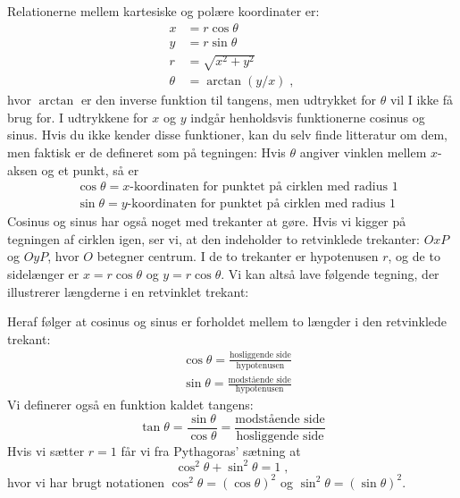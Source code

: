 Relationerne mellem kartesiske og polære koordinater er:
\begin{align*} \label{eq:kartesisk/polaer}
  x &= r \cos \theta \\
  y &= r \sin \theta \\
  r &= \sqrt{x^2 + y^2} \\
  \theta &= \arctan (y/x) \; ,
\end{align*}
hvor $\arctan$ er den inverse funktion til tangens, men udtrykket for
$\theta$ vil I ikke få brug for. I udtrykkene for $x$ og $y$ indgår
henholdsvis funktionerne cosinus og sinus. Hvis du ikke kender disse
funktioner, kan du selv finde litteratur om dem, men faktisk er de
defineret som på tegningen: Hvis $\theta$ angiver vinklen mellem
$x$-aksen og et punkt, så er
\begin{align*}
  &\cos \theta = \text{$x$-koordinaten for punktet på cirklen med
    radius $1$}\\
  &\sin \theta = \text{$y$-koordinaten for punktet på cirklen med
    radius $1$}
\end{align*}
Cosinus og sinus har også noget med trekanter at gøre. Hvis vi kigger
på tegningen af cirklen igen, ser vi, at den indeholder to retvinklede
trekanter: $OxP$ og $OyP$, hvor $O$ betegner centrum. I de to
trekanter er hypotenusen $r$, og de to sidelænger er $x = r
\cos\theta$ og $y = r \cos\theta$. Vi kan altså lave følgende tegning,
der illustrerer længderne i en retvinklet trekant:
\begin{center}
\end{center}
Heraf følger at cosinus og sinus er forholdet mellem to længder i den
retvinklede trekant:
\begin{align*}
  &\cos \theta = \frac{\text{hosliggende side}}{\text{hypotenusen}}\\
  &\sin \theta = \frac{\text{modstående side}}{\text{hypotenusen}}
\end{align*}
Vi definerer også en funktion kaldet tangens:
\[
  \tan \theta = \frac{\sin\theta}{\cos\theta}
  = \frac{\text{modstående side}}{\text{hosliggende side}}
\]
Hvis vi sætter $r=1$ får vi fra Pythagoras' sætning at
\begin{equation*}
  \cos^2 \theta + \sin^2 \theta = 1 \; ,
\end{equation*}
hvor vi har brugt notationen $\cos^2 \theta = (\cos\theta)^2$ og
$\sin^2 \theta = (\sin\theta)^2$.

